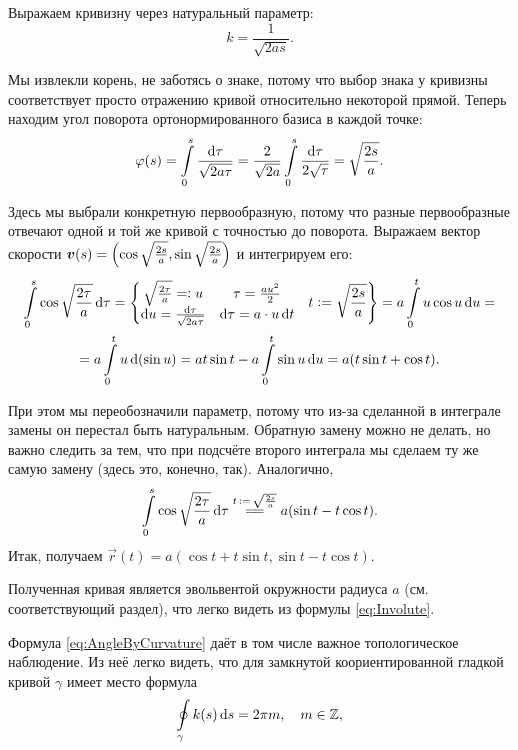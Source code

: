 
\begin{solution}
	Выражаем кривизну через натуральный параметр:
	\[
		k = \frac{1}{\sqrt{2as}}.
	\]

	Мы извлекли корень, не заботясь о знаке, потому что выбор знака у кривизны соответствует просто отражению кривой относительно некоторой прямой. Теперь находим угол поворота ортонормированного базиса в каждой точке:
	\[
		\varphi(s) = \int\limits_0^s\frac{\mathop{}\!\mathrm{d}\tau}{\sqrt{2a\tau}} = \frac{2}{\sqrt{2a}}\int\limits_0^s\frac{\mathop{}\!\mathrm{d}\tau}{2\sqrt{\tau}} = \sqrt{\frac{2s}{a}}.
	\]

	Здесь мы выбрали конкретную первообразную, потому что разные первообразные отвечают одной и той же кривой с точностью до поворота. Выражаем вектор скорости $\boldsymbol{v}(s) = \left(\cos\sqrt{\frac{2s}{a}}, \sin\sqrt{\frac{2s}{a}}\right)$ и интегрируем его:
	\begin{multline*}
		\int\limits_0^s\cos\sqrt{\frac{2\tau}{a}}\d\tau = \left\{
			\begin{matrix}
				\sqrt{\frac{2\tau}{a}} = \vcentcolon u & \tau = \frac{au^2}{2} \\
				\d u = \frac{\d\tau}{\sqrt{2a\tau}} & \d\tau = a \cdot u \d t
			\end{matrix}\quad t \vcentcolon = \sqrt{\frac{2s}{a}}
			\right\} = a\int\limits_0^tu\cos u\d u =\\ = a\int\limits_0^tu\d(\sin u) = a t\sin t - a\int\limits_0^t\sin u\d u = a(t\sin t + \cos t).
	\end{multline*}

	При этом мы переобозначили параметр, потому что из-за сделанной в интеграле замены он перестал быть натуральным. Обратную замену можно не делать, но важно следить за тем, что при подсчёте второго интеграла мы сделаем ту же самую замену (здесь это, конечно, так). Аналогично,
	\[
		\int\limits_0^s\cos\sqrt{\frac{2\tau}{a}}\d\tau \stackrel{t\,\vcentcolon =\,\sqrt{\frac{2s}{a}}}{=\joinrel=} a(\sin t - t\cos t).
	\]
	Итак, получаем $\vec{r}(t) = a(\cos t + t \sin t, \sin t - t \cos t)$.
\end{solution}

Полученная кривая является эвольвентой окружности радиуса $a$ (см. соответствующий раздел), что легко видеть из формулы \eqref{eq:Involute}.

Формула \eqref{eq:AngleByCurvature} даёт в том числе важное топологическое наблюдение. Из неё легко видеть, что для замкнутой коориентированной гладкой кривой $\gamma$ имеет место формула
\begin{equation} \label{eq:HomoTopInvariant}
	\oint\limits_{\gamma}k(s)\mathop{}\!\mathrm{d} s = 2\pi m,\quad m \in \mathbb{Z},
\end{equation}

